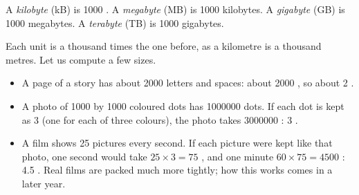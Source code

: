 \begin{definition}\label{def:g4:memory-and-storage:units}
A \emph{kilobyte} (kB) is \num{1000} . A
\emph{megabyte} (MB) is \num{1000} kilobytes. A
\emph{gigabyte} (GB) is \num{1000} megabytes. A
\emph{terabyte} (TB) is \num{1000} gigabytes.
\end{definition}

Each unit is a thousand times the one before, as a kilometre is a thousand
metres. Let us compute a few sizes.

\begin{example}\label{ex:g4:memory-and-storage:sizes}
\begin{itemize}
\item A page of a story has about \num{2000} letters and spaces: about
  \num{2000} , so about 2 .
\item A photo of \num{1000} by \num{1000} coloured dots has
  \num{1000000} dots. If each dot is kept as 3  (one for each of three
  colours), the photo takes \num{3000000} : 3 .
\item A film shows 25 pictures every second. If each picture were kept like
  that photo, one second would take $25 \times 3 = 75$ , and one
  minute $60 \times 75 = \num{4500}$ : 4.5 . Real films are
  packed much more tightly; how this works comes in a later year.
\end{itemize}
\end{example}


